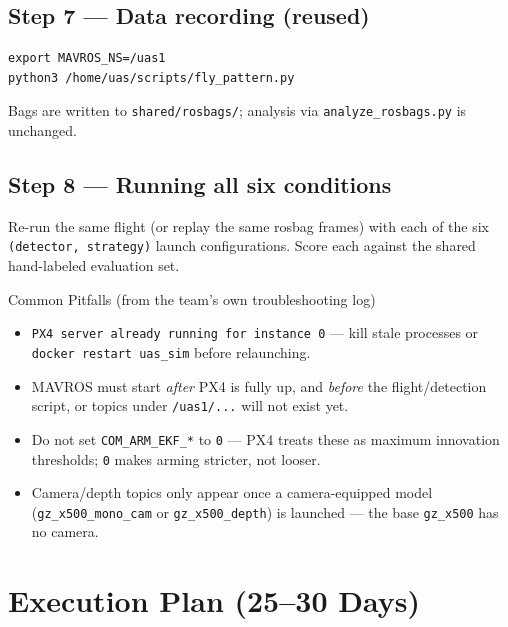 \documentclass[11pt,a4paper]{article}
\newcommand{\code}[1]{\texttt{\small #1}}
\begin{document}
\subsection{Step 7 --- Data recording (reused)}
\begin{verbatim}
export MAVROS_NS=/uas1
python3 /home/uas/scripts/fly_pattern.py
\end{verbatim}
Bags are written to \code{shared/rosbags/}; analysis via \code{analyze\_rosbags.py} is unchanged.

\subsection{Step 8 --- Running all six conditions}
Re-run the same flight (or replay the same rosbag frames) with each of the six \code{(detector, strategy)} launch configurations. Score each against the shared hand-labeled evaluation set.

\begin{warnbox}{Common Pitfalls (from the team's own troubleshooting log)}
\begin{itemize}[leftmargin=1.2cm]
    \item \code{PX4 server already running for instance 0} --- kill stale processes or \code{docker restart uas\_sim} before relaunching.
    \item MAVROS must start \emph{after} PX4 is fully up, and \emph{before} the flight/detection script, or topics under \code{/uas1/...} will not exist yet.
    \item Do not set \code{COM\_ARM\_EKF\_*} to \code{0} --- PX4 treats these as maximum innovation thresholds; \code{0} makes arming stricter, not looser.
    \item Camera/depth topics only appear once a camera-equipped model (\code{gz\_x500\_mono\_cam} or \code{gz\_x500\_depth}) is launched --- the base \code{gz\_x500} has no camera.
\end{itemize}
\end{warnbox}

\section{Execution Plan (25--30 Days)}
\end{document}
